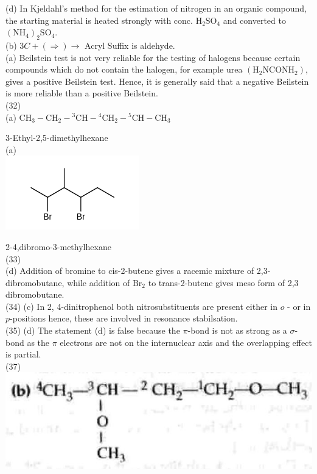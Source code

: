 \documentclass[10pt]{article}
\begin{document}
(d) In Kjeldahl's method for the estimation of nitrogen in an organic compound, the starting material is heated strongly with conc. $\mathrm{H}_{2} \mathrm{SO}_{4}$ and converted to $\left(\mathrm{NH}_{4}\right)_{2} \mathrm{SO}_{4}$.\\
(b) $3 C+(\Rightarrow) \rightarrow$ Acryl Suffix is aldehyde.\\
(a) Beilstein test is not very reliable for the testing of halogens because certain compounds which do not contain the halogen, for example urea $\left(\mathrm{H}_{2} \mathrm{NCONH}_{2}\right)$, gives a positive Beilstein test. Hence, it is generally said that a negative Beilstein is more reliable than a positive Beilstein.\\
(32)\\
(a) $\mathrm{CH}_{3}-\mathrm{CH}_{2}-{ }^{3} \mathrm{CH}-{ }^{4} \mathrm{CH}_{2}-{ }^{5} \mathrm{CH}-\mathrm{CH}_{3}$

3-Ethyl-2,5-dimethylhexane\\
(a)\\
\includegraphics{smile-e84b05f8b2884cba2f3b9400a1fc3eb7cfb214e5}

2-4,dibromo-3-methylhexane\\
(33)\\
(d) Addition of bromine to cis-2-butene gives a racemic mixture of 2,3-dibromobutane, while addition of $\mathrm{Br}_{2}$ to trans-2-butene gives meso form of 2,3 dibromobutane.\\
(34) (c) In 2, 4-dinitrophenol both nitrosubstituents are present either in $o$ - or in $p$-positions hence, these are involved in resonance stabilsation.\\
(35) (d) The statement (d) is false because the $\pi$-bond is not as strong as a $\sigma$-bond as the $\pi$ electrons are not on the internuclear axis and the overlapping effect is partial.\\
(37)\\
\includegraphics[max width=\textwidth, center]{2025_01_28_8470952b98110cec3aabg-158(2)}
\end{document}
